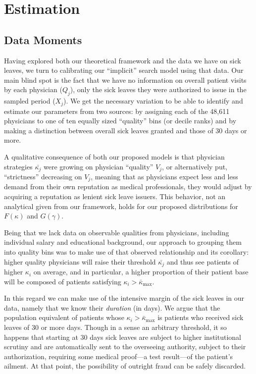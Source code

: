 \documentclass[../main.tex]{subfiles}
\begin{document}
\section{Estimation}

\subsection{Data Moments}
\label{sec:moments}

Having explored both our theoretical framework and the data we have on sick leaves, we turn to calibrating our ``implicit'' search model using that data. Our main blind spot is the fact that we have no information on overall patient visits by each physician ($Q_j$), only the sick leaves they were authorized to issue in the sampled period ($X_j$). We get the necessary variation to be able to identify and estimate our parameters from two sources: by assigning each of the 48,611 physicians to one of ten equally sized ``quality'' bins (or decile ranks) and by making a distinction between overall sick leaves granted and those of 30 days or more.

A qualitative consequence of both our proposed models is that physician strategies $\bar{\kappa_j}$ were growing on physician ``quality'' $V_j$, or alternatively put, ``strictness'' decreasing on $V_j$, meaning that as physicians expect less and less demand from their own reputation as medical professionals, they would adjust by acquiring a reputation as lenient sick leave issuers. This behavior, not an analytical given from our framework, holds for our proposed distributions for $F(\kappa)$ and $G(\gamma)$.

Being that we lack data on observable qualities from physicians, including individual salary and educational background, our approach to grouping them into quality bins was to make use of that observed relationship and its corollary: higher quality physicians will raise their threshold $\bar{\kappa_j}$ and thus see patients of higher $\kappa_i$ on average, and in particular, a higher proportion of their patient base will be composed of patients satisfying $\kappa_i > \bar{\kappa}_{\max}$.

In this regard we can make use of the intensive margin of the sick leaves in our data, namely that we know their \textit{duration} (in days). We argue that the population equivalent of patients whose $\kappa_i > \bar{\kappa}_{\max}$ is patients who received sick leaves of 30 or more days. Though in a sense an arbitrary threshold, it so happens that starting at 30 days sick leaves are subject to higher institutional scrutiny and are automatically sent to the overseeing authority, subject to their authorization, requiring some medical proof—a test result—of the patient's ailment. At that point, the possibility of outright fraud can be safely discarded.
\end{document}
